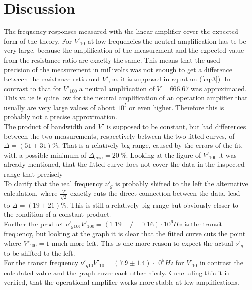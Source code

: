 \section{Discussion}
The frequency responses measured with the linear amplifier cover the expected form of the theory. For $V'_{10}$ at low frequencies the neutral amplification
has to be very large, because the amplification of the measurement and the expected value from the resistance ratio are exactly the same. This means that the used precision
of the measurement in millivolts was not enough to get a difference between the resistance ratio and $V'$, as it is supposed in equation (\ref{eq:3}). In contrast to that for $V'_{100}$
a neutral amplification of $V = 666.67$ was approximated. This value is quite low for the neutral amplification of an operation amplifier that usually are very large values of about $10^5$ or even higher.
Therefore this is probably not a precise approximation. \\
\newline
\noindent
The product of bandwidth and $V'$ is supposed to be constant, but had differences between the two measurements, respectively between the two fitted curves, of  $\Delta = (51 \pm 31)\%$. That is
a relatively big range, caused by the errors of the fit, with a possible minimum of $\Delta_{min} = \SI{20}{\percent}$. Looking at the figure of $V'_{100}$ it was already mentioned, that the fitted curve does not cover the
data in the inspected range that precisely. \\
To clarify that the real frequency $\nu'_g$ is probably shifted to the left the alternative calculation, where $\frac{V'}{\sqrt{2}}$ exactly cuts the direct connection between the
data, lead to $\Delta = (19 \pm 21)\%$. This is still a relatively big range but obviously closer to the condition of a constant product. \\
Further the product $\nu'_{g100} V'_{100} = (1.19+/-0.16)\cdot 10^6 Hz$ is the transit frequency, but looking at the graph it is clear that the fitted curve cuts the point where $V'_{100} = 1$ much more left.
This is one more reason to expect the actual $\nu'_g$ to be shifted to the left. \\
For the transit frequency $\nu'_{g10} V'_{10} = (7.9\pm 1.4)\cdot 10^5 Hz$ for $V'_{10}$ in contrast the calculated value and the graph cover each other nicely.
Concluding this it is verified, that the operational amplifier works more stable at low amplifications.\\
\newline
